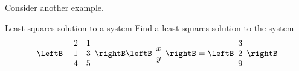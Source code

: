 Consider another example. 

\begin{example}{Least squares solution to a system}{}
Find a least squares solution to the system 
\begin{equation*}
\leftB
\begin{array}{rr}
2 & 1 \\ 
-1 & 3 \\ 
4 & 5
\end{array}
\rightB \leftB 
\begin{array}{c}
x \\ 
y
\end{array}
\rightB =\leftB 
\begin{array}{c}
3 \\ 
2 \\ 
9
\end{array}
\rightB
\end{equation*}
\end{example}

